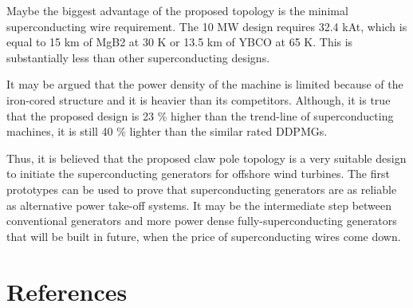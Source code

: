 \documentclass[12pt]{iopart}
\begin{document}
Maybe the biggest advantage of the proposed topology is the minimal superconducting wire requirement. The 10 MW design requires 32.4 kAt, which is equal to 15 km of MgB2 at 30 K or 13.5 km of YBCO at 65 K. This is substantially less than other superconducting designs.

It may be argued that the power density of the machine is limited because of the iron-cored structure and it is heavier than its competitors. Although, it is true that the proposed design is 23 \% higher than the trend-line of superconducting machines, it is still 40 \% lighter than the similar rated DDPMGs. 

Thus, it is believed that the proposed claw pole topology is a very suitable design to initiate the superconducting generators for offshore wind turbines. The first prototypes can be used to prove that superconducting generators are as reliable as alternative power take-off systems. It may be the intermediate step between conventional generators and more power dense fully-superconducting generators that will be built in future, when the price of superconducting wires come down.

\section*{References}



\end{document}
